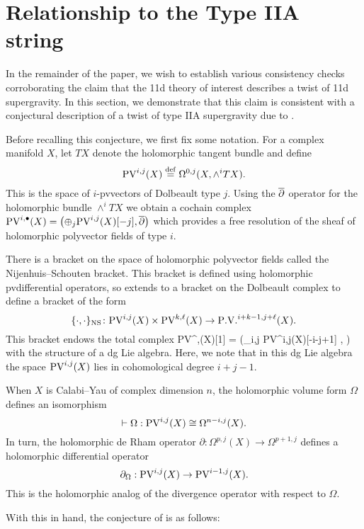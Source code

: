 \documentclass[11pt]{amsart}
\def\pv{{\rm PV}}
\begin{document}
\section{Relationship to the Type IIA string}
\label{sec:org355a726}
In the remainder of the paper, we wish to establish various consistency checks corroborating the claim that the 11d theory of interest describes a twist of 11d supergravity. In this section, we demonstrate that this claim is consistent with a conjectural description of a twist of type IIA supergravity due to \cite{}.

Before recalling this conjecture, we first fix some notation. For a complex manifold $X$, let $TX$ denote the holomorphic tangent bundle and define
\[
\pv^{i,j}(X) \define \Omega^{0,j}(X, \wedge^{i} TX) .\]
This is the space of $i$-pvvectors of Dolbeault type $j$.
Using the $\overline{\partial}$ operator for the holomorphic bundle $\wedge^{i}TX$ we obtain a cochain complex $\pv^{i,\bu}(X) = \left(\oplus_{j} \pv^{i,j}(X) [-j], \dbar \right)$ which provides a free resolution of the sheaf of holomorphic polyvector fields of type $i$.

There is a bracket on the space of holomorphic polyvector fields called the Nijenhuis--Schouten bracket.
This bracket is defined using holomorphic pvdifferential operators, so extends to a bracket on the Dolbeault complex to define a bracket of the form
\[
  \{\cdot, \cdot\}_{\rm NS} \colon \pv^{i,j}(X) \times \pv^{k,\ell}(X) \to \PV^{i+k-1, j+\ell}(X) .
\]
This bracket endows the total complex
\beqn\label{eqn:pvlie1}
\pv^{\bu,\bu}(X)[1] = \left(\oplus_{i,j} \pv^{i,j}(X)[-i-j+1] , \dbar \right)
\eeqn
with the structure of a dg Lie algebra.
Here, we note that in this dg Lie algebra the space $\pv^{i,j}(X)$ lies in cohomological degree $i+j-1$.

When $X$ is Calabi--Yau of complex dimension $n$, the holomorphic volume form $\Omega$ defines an isomorphism
\[
  \vdash \Omega : \pv^{i,j}(X) \cong \Omega^{n-i, j}(X).
\]
In turn, the holomorphic de Rham operator $\partial : \Omega^{p, j}(X) \to \Omega^{p+1,j}$ defines a holomorphic differential operator
\[
  \partial_{\Omega} : \pv^{i,j}(X) \to \pv^{i-1,j}(X) .
\]
This is the holomorphic analog of the divergence operator with respect to $\Omega$.

With this in hand, the conjecture of \cite{} is as follows:
\end{document}
